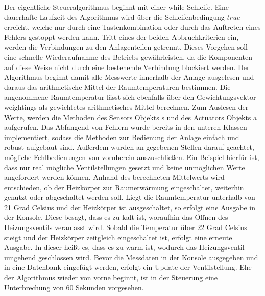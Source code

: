 Der eigentliche Steueralgorithmus beginnt mit einer while-Schleife. Eine dauerhafte Laufzeit des Algorithmus wird über die Schleifenbedingung $true$ erreicht, welche nur durch eine Tastenkombination oder durch das Auftreten eines Fehlers gestoppt werden kann.
 Tritt eines der beiden Abbruchkriterien ein, werden die Verbindungen zu den Anlagenteilen getrennt. Dieses Vorgehen soll eine schnelle Wiederaufnahme des Betriebs gewährleisten, da die Komponenten auf diese Weise nicht durch eine bestehende Verbindung blockiert werden.
Der Algorithmus beginnt damit alle Messwerte innerhalb der Anlage ausgelesen und daraus das arithmetische Mittel der Raumtemperaturen bestimmen. Die angenommene Raumtemperatur lässt sich ebenfalls über den Gewichtungsvektor weightings als gewichtetes arithmetisches Mittel berechnen.
Zum Auslesen der Werte, werden die Methoden des Sensors Objekts s und des Actuators Objekts a aufgerufen.
Das Abfangend von Fehlern wurde bereits in den unteren Klassen implementiert, sodass die Methoden zur Bedienung der Anlage einfach und robust aufgebaut sind. Außerdem wurden an gegebenen Stellen darauf geachtet, mögliche Fehlbedienungen  von vornherein auszuschließen. Ein Beispiel hierfür ist, dass nur real mögliche Ventilstellungen gesetzt und keine unmöglichen Werte angefordert werden können.
Anhand des berechneten Mittelwerts wird entschieden, ob der Heizkörper zur Raumerwärmung eingeschaltet, weiterhin genutzt oder abgeschaltet werden soll. Liegt die Raumtemperatur unterhalb von 21 Grad Celsius und der Heizkörper ist ausgeschaltet, so erfolgt eine Ausgabe in der Konsole. Diese besagt, dass es zu kalt ist, woraufhin das Öffnen des Heizungsventils veranlasst wird. Sobald die Temperatur über 22 Grad Celsius steigt und der Heizkörper zeitgleich eingeschaltet ist, erfolgt eine erneute Ausgabe. In dieser heißt es, dass es zu warm ist, wodurch das Heizungsventil umgehend geschlossen wird.
Bevor die Messdaten in der Konsole ausgegeben und in eine Datenbank eingefügt werden, erfolgt ein Update der Ventilstellung. Ehe der Algorithmus wieder von vorne beginnt, ist in der Steuerung eine Unterbrechung von 60 Sekunden vorgesehen.




